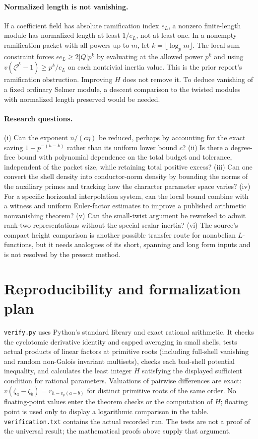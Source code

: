 \documentclass[11pt]{article}
\theoremstyle{remark}\newtheorem{remark}[theorem]{Remark}
\begin{document}
\paragraph{Normalized length is not vanishing.}
If a coefficient field has absolute ramification index $e_L$, a
nonzero finite-length module has normalized length at least $1/e_L$,
not at least one. In a nonempty ramification packet with all powers up
to $m$, let $k=\lfloor\log_p m\rfloor$. The local sum constraint forces
$\epsilon e_L\ge2|Q|p^k$ by evaluating at the allowed power $p^k$ and
using $v(\zeta^{p^k}-1)\ge p^k/e_L$ on each nontrivial inertia value.
This is the prior report's ramification obstruction. Improving $H$
does not remove it. To deduce vanishing of a fixed ordinary Selmer
module, a descent comparison to the twisted modules with normalized
length preserved would be needed.

\paragraph{Research questions.}
(i) Can the exponent $n/(c\eta)$ be reduced, perhaps by accounting for
the exact saving $1-p^{-(h-k)}$ rather than its uniform lower bound $c$?
(ii) Is there a degree-free bound with polynomial dependence on the
total budget and tolerance, independent of the packet size, while
retaining total positive excess? (iii) Can one convert the shell density
into conductor-norm density by bounding the norms of the auxiliary primes
and tracking how the character parameter space varies? (iv) For a
specific horizontal interpolation system, can the local bound combine
with a witness and uniform Euler-factor estimates to improve a published
arithmetic nonvanishing theorem? (v) Can the small-twist argument be
reworked to admit rank-two representations without the special scalar
inertia? (vi) The source's compact height comparison is another possible
transfer route for nonabelian $L$-functions, but it needs analogues of its
short, spanning and long form inputs and is not resolved by the present
method.

\section{Reproducibility and formalization plan}

\texttt{verify.py} uses Python's standard library and exact rational
arithmetic. It checks the cyclotomic derivative identity and capped
averaging in small shells, tests actual products of linear factors at
primitive roots (including full-shell vanishing and random non-Galois
invariant multisets), checks each bad-shell potential inequality, and
calculates the least integer $H$ satisfying the displayed sufficient
condition for rational parameters. Valuations of pairwise differences
are exact: $v(\zeta_a-\zeta_b)=r_{h-v_p(a-b)}$ for distinct primitive
roots of the same order. No floating-point values enter the theorem
checks or the computation of $H$; floating point is used only to display
a logarithmic comparison in the table. \texttt{verification.txt}
contains the actual recorded run. The tests are not a proof of the
universal result; the mathematical proofs above supply that argument.
\end{document}
